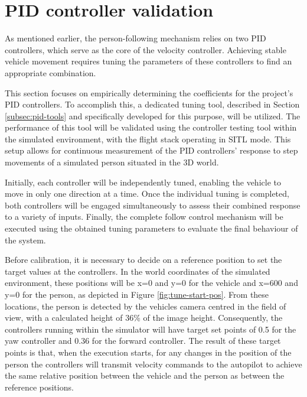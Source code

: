 \section{PID controller validation}
\label{sec:test-1-pid}


As mentioned earlier, the person-following mechanism relies on two PID controllers, which serve as the core of the velocity controller. Achieving stable vehicle movement requires tuning the parameters of these controllers to find an appropriate combination.

This section focuses on empirically determining the coefficients for the project's PID controllers. To accomplish this, a dedicated tuning tool, described in Section \ref{subsec:pid-tools} and specifically developed for this purpose, will be utilized. The performance of this tool will be validated using the controller testing tool within the simulated environment, with the flight stack operating in SITL mode. This setup allows for continuous measurement of the PID controllers' response to step movements of a simulated person situated in the 3D world.

Initially, each controller will be independently tuned, enabling the vehicle to move in only one direction at a time. Once the individual tuning is completed, both controllers will be engaged simultaneously to assess their combined response to a variety of inputs. Finally, the complete follow control mechanism will be executed using the obtained tuning parameters to evaluate the final behaviour of the system.

Before calibration, it is necessary to decide on a reference position to set the target values at the controllers. In the world coordinates of the simulated environment, these positions will be x=0 and y=0 for the vehicle and x=600 and y=0 for the person, as depicted in Figure \ref{fig:tune-start-pos}.
From these locations, the person is detected by the vehicles camera centred in the field of view, with a calculated height of 36\% of the image height. Consequently, the controllers running within the simulator will have target set points of 0.5 for the yaw controller and 0.36 for the forward controller.
The result of these target points is that, when the execution starts, for any changes in the position of the person the controllers will transmit velocity commands to the autopilot to achieve the same relative position between the vehicle and the person as between the reference positions.


